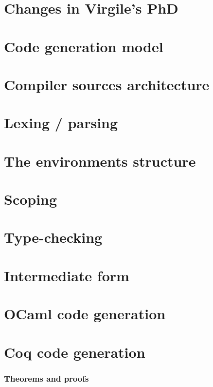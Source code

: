 \documentclass{book}
\begin{document}
\setcounter{tocdepth}{1}
\tableofcontents


\chapter{Changes in Virgile's PhD}


\chapter{Code generation model}


\chapter{Compiler sources architecture}


\chapter{Lexing / parsing}


\chapter{The environments structure}


\chapter{Scoping}


\chapter{Type-checking}


\chapter{Intermediate form}


\chapter{OCaml code generation}


\chapter{Coq code generation}
\subsection{Theorems and proofs}
\end{document}
